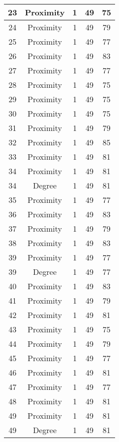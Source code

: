 \documentclass[results.tex]{subfiles}
\begin{document}
\begin{center}
\begin{tabular}{| c || c | c | c | c |}
    \hline
    23 & Proximity & 1 & 49 & 75 \\ 
    \hline
    24 & Proximity & 1 & 49 & 79 \\ 
    \hline
    25 & Proximity & 1 & 49 & 77 \\ 
    \hline
    26 & Proximity & 1 & 49 & 83 \\ 
    \hline
    27 & Proximity & 1 & 49 & 77 \\ 
    \hline
    28 & Proximity & 1 & 49 & 75 \\ 
    \hline
    29 & Proximity & 1 & 49 & 75 \\ 
    \hline
    30 & Proximity & 1 & 49 & 75 \\ 
    \hline
    31 & Proximity & 1 & 49 & 79 \\ 
    \hline
    32 & Proximity & 1 & 49 & 85 \\ 
    \hline
    33 & Proximity & 1 & 49 & 81 \\ 
    \hline
    34 & Proximity & 1 & 49 & 81 \\ 
    \hline
    34 & Degree & 1 & 49 & 81 \\ 
    \hline
    35 & Proximity & 1 & 49 & 77 \\ 
    \hline
    36 & Proximity & 1 & 49 & 83 \\ 
    \hline
    37 & Proximity & 1 & 49 & 79 \\ 
    \hline
    38 & Proximity & 1 & 49 & 83 \\ 
    \hline
    39 & Proximity & 1 & 49 & 77 \\ 
    \hline
    39 & Degree & 1 & 49 & 77 \\ 
    \hline
    40 & Proximity & 1 & 49 & 83 \\ 
    \hline
    41 & Proximity & 1 & 49 & 79 \\ 
    \hline
    42 & Proximity & 1 & 49 & 81 \\ 
    \hline
    43 & Proximity & 1 & 49 & 75 \\ 
    \hline
    44 & Proximity & 1 & 49 & 79 \\ 
    \hline
    45 & Proximity & 1 & 49 & 77 \\ 
    \hline
    46 & Proximity & 1 & 49 & 81 \\ 
    \hline
    47 & Proximity & 1 & 49 & 77 \\ 
    \hline
    48 & Proximity & 1 & 49 & 81 \\ 
    \hline
    49 & Proximity & 1 & 49 & 81 \\ 
    \hline
    49 & Degree & 1 & 49 & 81 \\ 
    \hline   \end{tabular}
\end{center}
\end{document}
